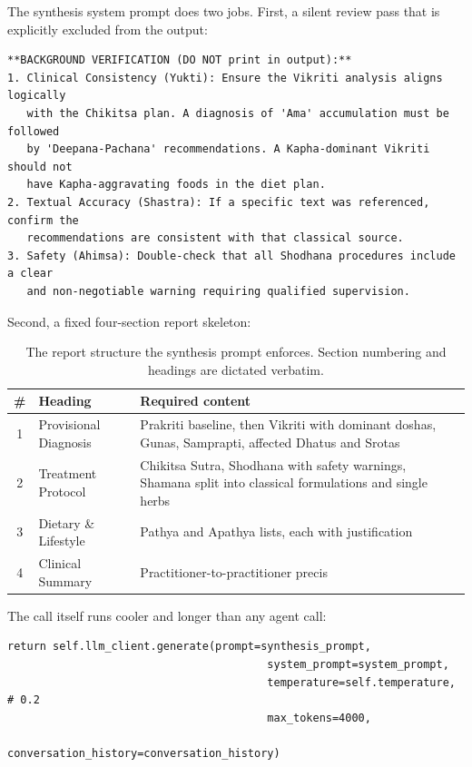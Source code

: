 The synthesis system prompt does two jobs. First, a silent review pass that is explicitly excluded from the output:

\begin{lstlisting}[style=plain]
**BACKGROUND VERIFICATION (DO NOT print in output):**
1. Clinical Consistency (Yukti): Ensure the Vikriti analysis aligns logically
   with the Chikitsa plan. A diagnosis of 'Ama' accumulation must be followed
   by 'Deepana-Pachana' recommendations. A Kapha-dominant Vikriti should not
   have Kapha-aggravating foods in the diet plan.
2. Textual Accuracy (Shastra): If a specific text was referenced, confirm the
   recommendations are consistent with that classical source.
3. Safety (Ahimsa): Double-check that all Shodhana procedures include a clear
   and non-negotiable warning requiring qualified supervision.
\end{lstlisting}

Second, a fixed four-section report skeleton:

\begin{table}[H]
\centering
\small
\begin{tabularx}{\textwidth}{@{}c l X@{}}
\toprule
\textbf{\#} & \textbf{Heading} & \textbf{Required content} \\
\midrule
1 & Provisional Diagnosis & Prakriti baseline, then Vikriti with dominant doshas, Gunas, Samprapti, affected Dhatus and Srotas \\
2 & Treatment Protocol & Chikitsa Sutra, Shodhana with safety warnings, Shamana split into classical formulations and single herbs \\
3 & Dietary \& Lifestyle & Pathya and Apathya lists, each with justification \\
4 & Clinical Summary & Practitioner-to-practitioner precis \\
\bottomrule
\end{tabularx}
\caption{The report structure the synthesis prompt enforces. Section numbering and headings are dictated verbatim.}
\end{table}

The call itself runs cooler and longer than any agent call:

\begin{lstlisting}[style=py,firstnumber=147]
        return self.llm_client.generate(prompt=synthesis_prompt,
                                        system_prompt=system_prompt,
                                        temperature=self.temperature,   # 0.2
                                        max_tokens=4000,
                                        conversation_history=conversation_history)
\end{lstlisting}

